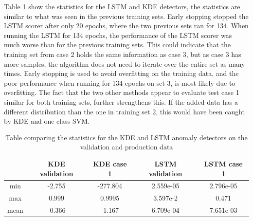         Table \ref{tab:trainining_plant2_long_stats} show the statistics for the LSTM and KDE detectors, the statistics are similar to what was seen in the previous training sets. Early stopping stopped the LSTM scorer after only 20 epochs, where the two previous sets ran for 134. When running the LSTM for 134 epochs, the performance of the LSTM scorer was much worse than for the previous training sets. This could indicate that the training set from case 2 holds the same information as case 3, but as case 3 has more samples, the algorithm does not need to iterate over the entire set as many times. Early stopping is used to avoid overfitting on the training data, and the poor performance when running for 134 epochs on set 3, is most likely due to overfitting. The fact that the two other methods appear to evaluate test case 1 similar for both training sets, further strengthens this. If the added data has a different distribution than the one in training set 2, this would have been caught by KDE and one class SVM.     
        \begin{table}[]
            \centering
            \begin{tabular}{|c|c|c|c|c|}
                \hline
                            & KDE validation  & KDE case 1     & LSTM validation & LSTM case 1   \\ \hline
                min         & -2.755    & -277.804              & 2.559e-05         & 2.796e-05         \\ \hline
                max         & 0.999     & 0.9995                & 3.597e-2          & 0.471             \\ \hline
                mean        & -0.366   & -1.167                 & 6.709e-04         & 7.651e-03          \\ \hline
            \end{tabular}
            \caption{Table comparing the statistics for the KDE and LSTM anomaly detectors on the validation and production data}
            \label{tab:trainining_plant2_long_stats}
        \end{table}




